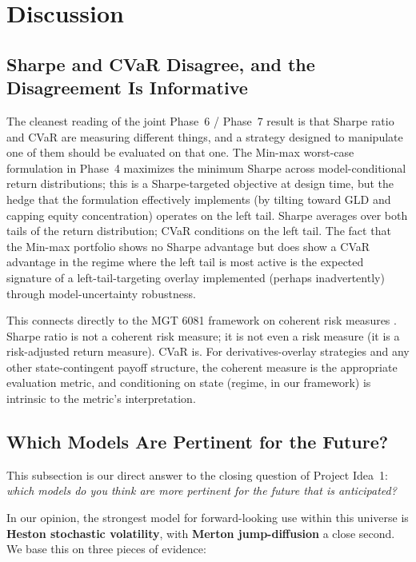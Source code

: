 \documentclass[11pt,letterpaper]{article}
\begin{document}
\section{Discussion}

\subsection{Sharpe and CVaR Disagree, and the Disagreement Is Informative}

The cleanest reading of the joint Phase~6 / Phase~7 result is that Sharpe ratio and CVaR are measuring different things, and a strategy designed to manipulate one of them should be evaluated on that one. The Min-max worst-case formulation in Phase~4 maximizes the minimum Sharpe across model-conditional return distributions; this is a Sharpe-targeted objective at design time, but the hedge that the formulation effectively implements (by tilting toward GLD and capping equity concentration) operates on the left tail. Sharpe averages over both tails of the return distribution; CVaR conditions on the left tail. The fact that the Min-max portfolio shows no Sharpe advantage but does show a CVaR advantage in the regime where the left tail is most active is the expected signature of a left-tail-targeting overlay implemented (perhaps inadvertently) through model-uncertainty robustness.

This connects directly to the MGT 6081 framework on coherent risk measures \citep{artzner1999coherent, rockafellar2002conditional}. Sharpe ratio is not a coherent risk measure; it is not even a risk measure (it is a risk-adjusted return measure). CVaR is. For derivatives-overlay strategies and any other state-contingent payoff structure, the coherent measure is the appropriate evaluation metric, and conditioning on state (regime, in our framework) is intrinsic to the metric's interpretation.

\subsection{Which Models Are Pertinent for the Future?}

This subsection is our direct answer to the closing question of Project Idea~1: \emph{which models do you think are more pertinent for the future that is anticipated?}

In our opinion, the strongest model for forward-looking use within this universe is \textbf{Heston stochastic volatility}, with \textbf{Merton jump-diffusion} a close second. We base this on three pieces of evidence:
\end{document}
